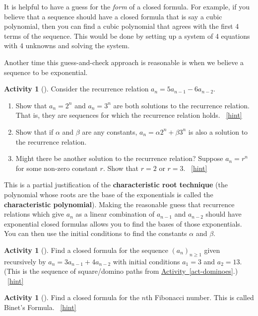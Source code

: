 \documentclass[10pt,]{book}
\newcommand{\terminology}[1]{\textbf{#1}}
\theoremstyle{plain}
\theoremstyle{definition}
\theoremstyle{definition}
\theoremstyle{definition}
\newtheorem{activity}[project]{Activity}
\numberwithin{equation}{chapter}
\begin{document}
\hypertarget{p-947}{}%
It is helpful to have a guess for the \emph{form} of a closed formula.  For example, if you believe that a sequence should have a closed formula that is say a cubic polynomial, then you can find a cubic polynomial that agrees with the first 4 terms of the sequence.  This would be done by setting up a system of 4 equations with 4 unknowns and solving the system.%
\par
\hypertarget{p-948}{}%
Another time this guess-and-check approach is reasonable is when we believe a sequence to be exponential.%
\begin{activity}[]\label{activity-141}
\hypertarget{p-949}{}%
Consider the recurrence relation \(a_n = 5a_{n-1} - 6a_{n-2}\).%
\begin{enumerate}[font=\bfseries,label=(\alph*),ref=\alph*]
\item\label{task-182} \hypertarget{p-950}{}%
Show that \(a_n = 2^n\) and \(a_n = 3^n\) are both solutions to the recurrence relation.  That is, they are sequences for which the recurrence relation holds.%
~\hfill{\tiny\hyperlink{a-148.a}{[hint]}\hypertarget{q-148.a}{}}\item\label{task-183} \hypertarget{p-952}{}%
Show that if \(\alpha\) and \(\beta\) are any constants, \(a_n = \alpha 2^n + \beta 3^n\) is also a solution to the recurrence relation.%
\item\label{task-184} \hypertarget{p-953}{}%
Might there be another solution to the recurrence relation?  Suppose \(a_n = r^n\) for some non-zero constant \(r\).  Show that \(r = 2\) or \(r = 3\).%
~\hfill{\tiny\hyperlink{a-148.c}{[hint]}\hypertarget{q-148.c}{}}\end{enumerate}
\end{activity}
\hypertarget{p-955}{}%
This is a partial justification of the \terminology{characteristic root technique} (the polynomial whose roots are the base of the exponentials is called the \terminology{characteristic polynomial}).  Making the reasonable guess that recurrence relations which give \(a_n\) as a linear combination of \(a_{n-1}\) and \(a_{n-2}\) should have exponential closed formulas allows you to find the bases of those exponentials.  You can then use the initial conditions to find the constants \(\alpha\) and \(\beta\).%
\begin{activity}[]\label{activity-142}
\hypertarget{p-956}{}%
Find a closed formula for the sequence \((a_n)_{n \ge 1}\) given recursively by \(a_n = 3a_{n-1} + 4a_{n-2}\) with initial conditions \(a_1 = 3\) and \(a_2 = 13\).  (This is the sequence of square/domino paths from \hyperref[act-dominoes]{Activity~\ref{act-dominoes}}.)%
~\hfill{\tiny\hyperlink{a-149}{[hint]}\hypertarget{q-149}{}}\end{activity}
\begin{activity}[]\label{act-binet}
\hypertarget{p-958}{}%
Find a closed formula for the \(n\)th Fibonacci number.  This is called Binet's Formula.%
~\hfill{\tiny\hyperlink{a-150}{[hint]}\hypertarget{q-150}{}}\end{activity}
\typeout{************************************************}
\typeout{************************************************}
\end{document}
